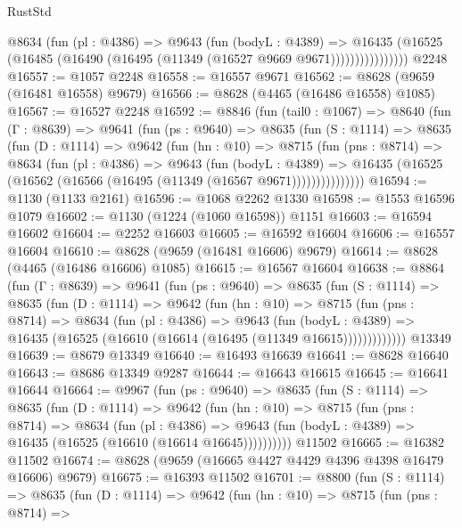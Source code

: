 \begin{lexlean}{RustStd}
\begin{coremodule}
                  @8634
                    (fun (pl : @4386) =>
                    @9643
                      (fun (bodyL : @4389) =>
                      @16435
                        (@16525 (@16485 (@16490 (@16495 (@11349 (@16527 @9669 @9671))))))))))))))))
    @2248
@16557 := @1057 @2248
@16558 := @16557 @9671
@16562 := @8628 (@9659 (@16481 @16558) @9679)
@16566 := @8628 (@4465 (@16486 @16558) @1085)
@16567 := @16527 @2248
@16592 := @8846
    (fun (tail0 : @1067) =>
    @8640
      (fun (Γ : @8639) =>
      @9641
        (fun (ps : @9640) =>
        @8635
          (fun (S : @1114) =>
          @8635
            (fun (D : @1114) =>
            @9642
              (fun (hn : @10) =>
              @8715
                (fun (pns : @8714) =>
                @8634
                  (fun (pl : @4386) =>
                  @9643
                    (fun (bodyL : @4389) =>
                    @16435 (@16525 (@16562 (@16566 (@16495 (@11349 (@16567 @9671)))))))))))))))
@16594 := @1130 (@1133 @2161)
@16596 := @1068 @2262 @1330
@16598 := @1553 @16596 @1079
@16602 := @1130 (@1224 (@1060 @16598)) @1151
@16603 := @16594 @16602
@16604 := @2252 @16603
@16605 := @16592 @16604
@16606 := @16557 @16604
@16610 := @8628 (@9659 (@16481 @16606) @9679)
@16614 := @8628 (@4465 (@16486 @16606) @1085)
@16615 := @16567 @16604
@16638 := @8864
    (fun (Γ : @8639) =>
    @9641
      (fun (ps : @9640) =>
      @8635
        (fun (S : @1114) =>
        @8635
          (fun (D : @1114) =>
          @9642
            (fun (hn : @10) =>
            @8715
              (fun (pns : @8714) =>
              @8634
                (fun (pl : @4386) =>
                @9643
                  (fun (bodyL : @4389) =>
                  @16435 (@16525 (@16610 (@16614 (@16495 (@11349 @16615)))))))))))))
    @13349
@16639 := @8679 @13349
@16640 := @16493 @16639
@16641 := @8628 @16640
@16643 := @8686 @13349 @9287
@16644 := @16643 @16615
@16645 := @16641 @16644
@16664 := @9967
    (fun (ps : @9640) =>
    @8635
      (fun (S : @1114) =>
      @8635
        (fun (D : @1114) =>
        @9642
          (fun (hn : @10) =>
          @8715
            (fun (pns : @8714) =>
            @8634
              (fun (pl : @4386) =>
              @9643 (fun (bodyL : @4389) => @16435 (@16525 (@16610 (@16614 @16645))))))))))
    @11502
@16665 := @16382 @11502
@16674 := @8628 (@9659 (@16665 @4427 @4429 @4396 @4398 @16479 @16606) @9679)
@16675 := @16393 @11502
@16701 := @8800
    (fun (S : @1114) =>
    @8635
      (fun (D : @1114) =>
      @9642
        (fun (hn : @10) =>
        @8715
          (fun (pns : @8714) =>

\end{coremodule}
\end{lexlean}
